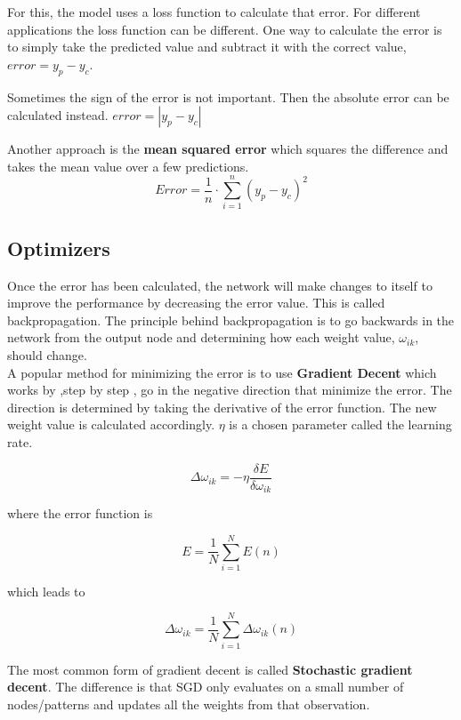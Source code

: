 For this, the model uses a loss function to calculate that error. For different applications the loss function can be different.
One way to calculate the error is to simply take the predicted value and subtract it with the correct value, $ error = y_p - y_c $.

Sometimes the sign of the error is not important. Then the absolute error can be calculated instead. $error = |y_p - y_c| $

Another approach is the \textbf{mean squared error} which squares the difference and takes the mean value over a few predictions.
\[Error = \frac{1}{n} \cdot \displaystyle\sum_{i=1}^{n} (y_p - y_c)^{2} \]


\subsection{Optimizers}
Once the error has been calculated, the network will make changes to itself to improve the performance by decreasing the error value. This is called backpropagation.
The principle behind backpropagation is to go backwards in the network from the output node and determining how each weight value, $ \omega_{ik} $, should change.\\

A popular method for minimizing the error is to use \textbf{Gradient Decent} which works by ,step by step , go in the negative direction that minimize the error.
The direction is determined by taking the derivative of the error function.
The new weight value is calculated accordingly. $\eta$ is a chosen parameter called the learning rate.

\[ \Delta \omega_{ik} = -\eta \frac{\delta E}{\delta \omega_{ik}} \]

\begin{center}
where the error function is
\end{center}

\[E = \frac{1}{N} \displaystyle\sum_{i=1}^{N} E(n) \]

\begin{center}
which leads to
\end{center}

\[ \Delta\omega_{ik} = \frac{1}{N}  \displaystyle\sum_{i=1}^{N} \Delta\omega_{ik}(n) \]

The most common form of gradient decent is called \textbf{Stochastic gradient decent}.
The difference is that SGD only evaluates on a small number of nodes/patterns and updates all the weights from that observation.

